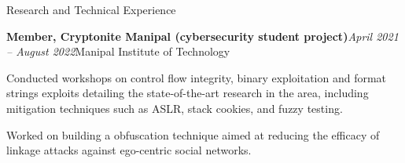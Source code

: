 \documentclass{resume} %
\begin{document}
\begin{rSection}{Research and Technical Experience}
\begin{rSubsection}{\bf Member, Cryptonite Manipal (cybersecurity student project)}{\em April 2021 -- August 2022}{Manipal Institute of Technology}{}
\item Conducted workshops on control flow integrity, binary exploitation and format strings exploits detailing the state-of-the-art research in the area, including mitigation techniques such as ASLR, stack cookies, and fuzzy testing.
\item Worked on building a obfuscation technique aimed at reducing the efficacy of linkage attacks against ego-centric social networks.
\end{rSubsection}
\end{rSection}
\end{document}
